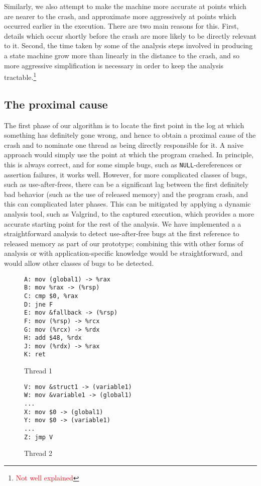 \documentclass[10pt,twocolumn,preprint,natbib,authoryear]{sigplanconf}
\makeatletter
\newcommand{\editorial}[1]{\textcolor{red}{\footnote{\textcolor{red}{#1}}}}
\newenvironment{subfloat}%
    {\def\caption##1{\gdef\subcapsave{\relax##1}}%
     \let\subcapsave=\@empty %
     \let\sf@oldlabel=\label
     \def\label##1{\xdef\sublabsave{\noexpand\label{##1}}}%
     \let\sublabsave\relax    %
     \setbox\subfigbox\hbox
       \bgroup}%
      {\egroup                %
     \let\label=\sf@oldlabel
     \subfigure[\subcapsave]{\box\subfigbox}}%
\makeatother
\begin{document}
Similarly, we also attempt to make the machine more accurate at points
which are nearer to the crash, and approximate more aggressively at
points which occurred earlier in the execution.  There are two main
reasons for this.  First, details which occur shortly before the crash
are more likely to be directly relevant to it.  Second, the time taken
by some of the analysis steps involved in producing a state machine
grow more than linearly in the distance to the crash, and so more
aggressive simplification is necessary in order to keep the analysis
tractable.\editorial{Not well explained}

\subsection{The proximal cause}
\label{sect:prox_cause}
The first phase of our algorithm is to locate the first point in the
log at which something has definitely gone wrong, and hence to obtain
a proximal cause of the crash and to nominate one thread as being
directly responsible for it.  A naive approach would simply use the
point at which the program crashed.  In principle, this is always
correct, and for some simple bugs, such as \verb|NULL|-dereferences or
assertion failures, it works well.  However, for more complicated
classes of bugs, such as use-after-frees, there can be a significant
lag between the first definitely bad behavior (such as the use of
released memory) and the program crash, and this can complicated later
phases.  This can be mitigated by applying a dynamic analysis tool,
such as Valgrind\cite{Nethercote2007}, to the captured execution,
which provides a more accurate starting point for the rest of the
analysis.  We have implemented a a straightforward analysis to detect
use-after-free bugs at the first reference to released memory as part
of our prototype; combining this with other forms of analysis or with
application-specific knowledge would be straightforward, and would
allow other classes of bugs to be detected.

\begin{figure*}
 \begin{subfloat}
  \begin{minipage}{90mm}
\begin{verbatim}
A: mov (global1) -> %rax
B: mov %rax -> (%rsp)
C: cmp $0, %rax
D: jne F
E: mov &fallback -> (%rsp)
F: mov (%rsp) -> %rcx
G: mov (%rcx) -> %rdx
H: add $48, %rdx
J: mov (%rdx) -> %rax
K: ret
\end{verbatim}
  \end{minipage}
  \caption{Thread 1}
 \end{subfloat}
 \begin{subfloat}
  \begin{minipage}{90mm}
\begin{verbatim}
V: mov &struct1 -> (variable1)
W: mov &variable1 -> (global1)
...
X: mov $0 -> (global1)
Y: mov $0 -> (variable1)
...
Z: jmp V
\end{verbatim}
  \end{minipage}
  \caption{Thread 2}
 \end{subfloat}
 \caption{A buggy example of the privatize synchronization pattern.}
 \label{fig:broken_privatize}
\end{figure*}
\end{document}
